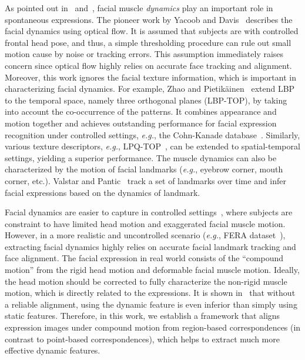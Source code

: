 \documentclass[journal]{IEEEtran}
\begin{document}
As pointed out in~\cite{Ekman2005} and~\cite{Ambadar05}, facial muscle \textit{dynamics} play an important role in spontaneous expressions. The pioneer work by Yacoob and Davis~\cite{Yacoob_PAMI96} describes the facial dynamics using optical flow. It is assumed that subjects are with controlled frontal head pose, and thus, a simple thresholding procedure can rule out small motion cause by noise or tracking errors. This assumption immediately raises concern since optical flow highly relies on accurate face tracking and alignment. Moreover, this work ignores the facial texture information, which is important in characterizing facial dynamics. For example, Zhao and Pietik\"ainen~\cite{Zhao_PAMI07} extend LBP to the temporal space, namely three orthogonal planes (LBP-TOP), by taking into account the co-occurrence of the patterns. It combines appearance and motion together and achieves outstanding performance for facial expression recognition under controlled settings, \textit{e.g.}, the Cohn-Kanade database~\cite{CKplus}. Similarly, various texture descriptors, \textit{e.g.}, LPQ-TOP~\cite{LPQ-TOP}, can be extended to spatial-temporal settings, yielding a superior performance. The muscle dynamics can also be characterized by the motion of facial landmarks (\textit{e.g.}, eyebrow corner, mouth corner, etc.). Valstar and Pantic~\cite{Valstar_SMCB12} track a set of landmarks over time and infer facial expressions based on the dynamics of landmark. 

Facial dynamics are easier to capture in controlled settings~\cite{CKplus}, where subjects are constraint to have limited head motion and exaggerated facial muscle motion. However, in a more realistic and uncontrolled scenario (\textit{e.g.}, FERA dataset~\cite{Valstar_FERA11}), extracting facial dynamics highly relies on accurate facial landmark tracking and face alignment. The facial expression in real world consists of the ``compound motion'' from the rigid head motion and deformable facial muscle motion. Ideally, the head motion should be corrected to fully characterize the non-rigid muscle motion, which is directly related to the expressions. It is shown in~\cite{Valstar12,Yang_SMCB12} that without a reliable alignment, using the dynamic feature is even inferior than simply using static features. Therefore, in this work, we establish a framework that aligns expression images under compound motion from region-based correspondences (in contrast to point-based correspondences), which helps to extract much more effective dynamic features. 
\end{document}
